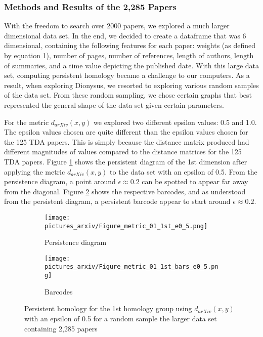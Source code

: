 \documentclass[12pt]{article}
\theoremstyle{definition}
\begin{document}
\subsubsection{Methods and Results of the 2,285 Papers}

With the freedom to search over 2000 papers, we explored a much larger dimensional data set. In the end, we decided to create a dataframe that was 6 dimensional, containing the following features for each paper: weights (as defined by equation 1), number of pages, number of references, length of authors, length of summaries, and a time value depicting the published date. With this large data set, computing persistent homology became a challenge to our computers. As a result, when exploring Dionysus, we resorted to exploring various random samples of the data set. From these random sampling, we chose certain graphs that best represented the general shape of the data set given certain parameters. 
\newline
\par For the metric $d_{arXiv}(x,y)$ we explored two different epsilon values: 0.5 and 1.0. The epsilon values chosen are quite different than the epsilon values chosen for the 125 TDA papers. This is simply because the distance matrix produced had different magnitudes of values compared to the distance matrices for the 125 TDA papers. Figure \ref{pic-final-metric_01-1st-e0.5} shows the persistent diagram of the 1st dimension after applying the metric $d_{arXiv}(x,y)$ to the data set with an epsilon of 0.5. From the persistence diagram, a point around $\epsilon\approx 0.2$ can be spotted to appear far away from the diagonal. Figure \ref{pic-final-metric_01-1st-bars-e0.5} shows the respective barcodes, and as understood from the persistent diagram, a persistent barcode appear to start around $\epsilon\approx 0.2$. 

\begin{figure}[h]
\begin{subfigure}{0.5\textwidth}
  \centering
  \texttt{[image: pictures\_arxiv/Figure\_metric\_01\_1st\_e0\_5.png]}
  \caption{Persistence diagram}
  \label{pic-final-metric_01-1st-e0.5}
\end{subfigure}
\begin{subfigure}{0.5\textwidth}
  \centering
  \texttt{[image: pictures\_arxiv/Figure\_metric\_01\_1st\_bars\_e0\_5.png]}
  \caption{Barcodes}
  \label{pic-final-metric_01-1st-bars-e0.5}
\end{subfigure}
\caption{Persistent homology for the 1st homology group using $d_{arXiv}(x,y)$ with an epsilon of 0.5 for a random sample the larger data set containing 2,285 papers}
\label{fig-metric_01-1st-e0.5}
\end{figure}
\end{document}
